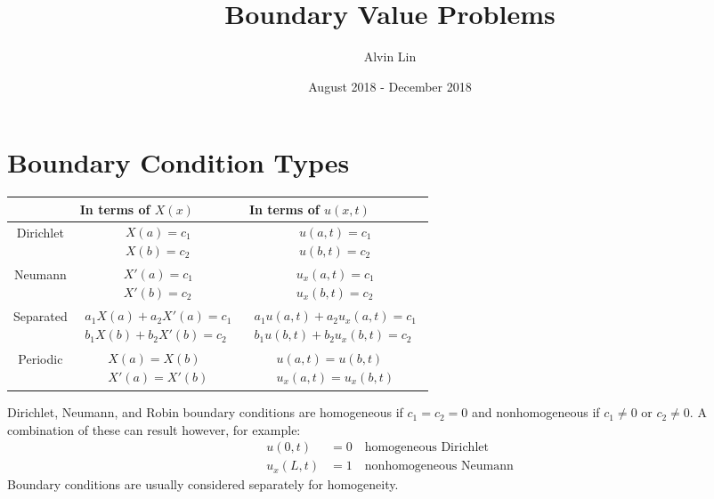 \documentclass{math}
\title{Boundary Value Problems}
\author{Alvin Lin}
\date{August 2018 - December 2018}
\begin{document}
\maketitle

\section*{Boundary Condition Types}
\begin{center}
  \begin{tabular}{|c|p{4cm}|p{4cm}|}
    \hline
    & In terms of \( X(x) \) & In terms of \( u(x,t) \) \\
    \hline
    Dirichlet & \begin{align*}
      X(a) = c_1 \\
      X(b) = c_2
    \end{align*} & \begin{align*}
      u(a,t) = c_1 \\
      u(b,t) = c_2
    \end{align*} \\
    \hline
    Neumann & \begin{align*}
      X'(a) = c_1 \\
      X'(b) = c_2
    \end{align*} & \begin{align*}
      u_x(a,t) = c_1 \\
      u_x(b,t) = c_2
    \end{align*} \\
    \hline
    Separated & \begin{align*}
      a_1X(a)+a_2X'(a) = c_1 \\
      b_1X(b)+b_2X'(b) = c_2
    \end{align*} & \begin{align*}
      a_1u(a,t)+a_2u_x(a,t) = c_1 \\
      b_1u(b,t)+b_2u_x(b,t) = c_2
    \end{align*} \\
    \hline
    Periodic & \begin{align*}
      X(a) = X(b) \\
      X'(a) = X'(b)
    \end{align*} & \begin{align*}
      u(a,t) = u(b,t) \\
      u_x(a,t) = u_x(b,t)
    \end{align*} \\
    \hline
  \end{tabular}
\end{center}
Dirichlet, Neumann, and Robin boundary conditions are homogeneous if
\( c_1 = c_2 = 0 \) and nonhomogeneous if \( c_1 \ne 0 \) or \( c_2 \ne 0 \).
A combination of these can result however, for example:
\begin{align*}
  u(0,t) &= 0 \quad \text{homogeneous Dirichlet} \\
  u_x(L,t) &= 1 \quad \text{nonhomogeneous Neumann}
\end{align*}
Boundary conditions are usually considered separately for homogeneity.
\end{document}
